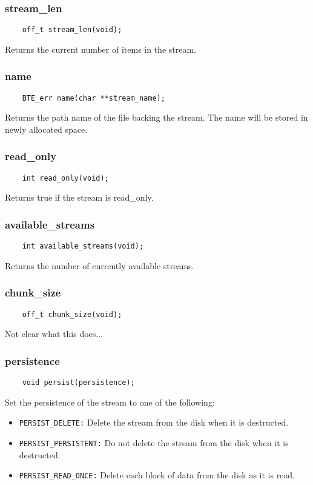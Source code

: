 \subsubsection{stream\_len}
\begin{verbatim}
    off_t stream_len(void);
\end{verbatim}
Returns the current number of items in the stream.


\subsubsection{name}
\begin{verbatim}
    BTE_err name(char **stream_name);
\end{verbatim}
Returns the path name of the file backing the stream. The name will be
stored in newly allocated space.


\subsubsection{read\_only}
\begin{verbatim}
    int read_only(void);
\end{verbatim}
Returns true if the stream is read\_only.

    
\subsubsection{available\_streams}
\begin{verbatim}
    int available_streams(void);    
\end{verbatim}
Returns the number of currently available streams.

\subsubsection{chunk\_size}
\begin{verbatim}
    off_t chunk_size(void);
\end{verbatim}
Not clear what this does...


\subsubsection{persistence}
\begin{verbatim}
    void persist(persistence);
\end{verbatim}
Set the persistence of the stream to one of the following:
\begin{itemize}
\item \verb|PERSIST_DELETE:| Delete the stream from the disk when it is
  destructed.
\item \verb|PERSIST_PERSISTENT:| Do not delete the stream from the disk when
  it is destructed.
\item \verb|PERSIST_READ_ONCE:| Delete each block of data from the disk as
  it is read.
\end{itemize}

